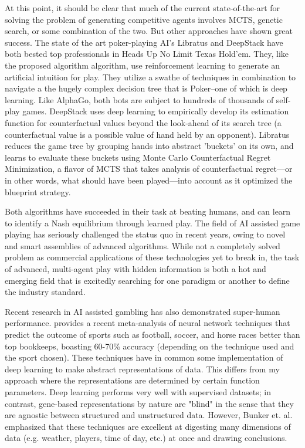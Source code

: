 \documentclass[11pt]{article}
\begin{document}
At this point, it should be clear that much of the current state-of-the-art for solving the problem of generating competitive agents involves MCTS, genetic search, or some combination of the two. But other approaches have shown great success. 
The state of the art poker-playing AI's Libratus \cite{Brown-2018} and DeepStack 
\cite{Moravcik-Schmid-2017} have both bested top professionals in Heads Up No Limit Texas Hold'em. They, like the proposed algorithm algorithm, use reinforcement learning to generate an artificial intuition for play. They utilize a swathe of techniques in combination to navigate a the hugely complex decision tree that is Poker--one of which is deep learning. Like AlphaGo, both bots are subject to hundreds of thousands of self-play games. DeepStack uses deep learning to empirically develop its estimation function for counterfactual values beyond the look-ahead of its search tree (a counterfactual value is a possible value of hand held by an opponent). Libratus reduces the game tree by grouping hands into abstract 'buckets' on its own, and learns to evaluate these buckets using Monte Carlo Counterfactual Regret Minimization, a flavor of MCTS that takes analysis of counterfactual regret---or in other words, what should have been played---into account as it optimized the blueprint strategy.

Both algorithms have succeeded in their task at beating humans, and can learn to identify a Nash equilibrium through learned play. The field of AI assisted game playing has seriously challenged the status quo in recent years, owing to novel and smart assemblies of advanced algorithms. While not a completely solved problem as commercial applications of these technologies yet to break in, the task of advanced, multi-agent play with hidden information is both a hot and emerging field that is excitedly searching for one paradigm or another to define the industry standard. 

Recent research in AI assisted gambling has also demonstrated super-human performance. \cite{Bunk-2017} provides a recent meta-analysis of neural network techniques that predict the outcome of sports such as football, soccer, and horse races better than top bookkeeps, boasting 60-70\% accuracy (depending on the technique used and the sport chosen). These techniques have in common some implementation of deep learning to make abstract representations of data. This differs from my approach where the representations are determined by certain function parameters. Deep learning performs very well with supervised datasets; in contrast, gene-based representations by nature are "blind" in the sense that they are agnostic between structured and unstructured data. However, Bunker et. al. emphasized that these techniques are excellent at digesting many dimensions of data (e.g. weather, players, time of day, etc.) at once and drawing conclusions.
\end{document}
